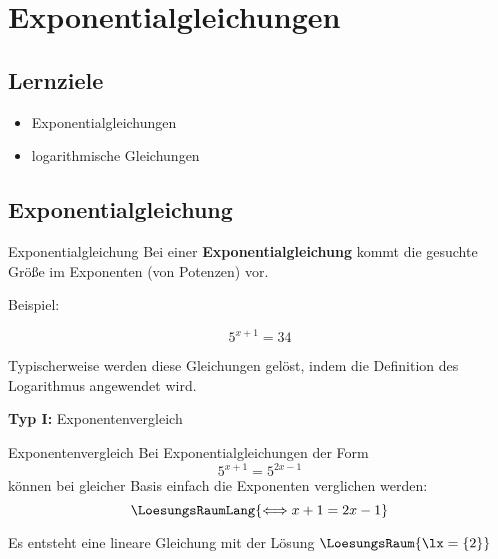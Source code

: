 
\section{Exponentialgleichungen}

\subsection*{Lernziele}

\begin{itemize}
\item Exponentialgleichungen
\item logarithmische Gleichungen 
\end{itemize}



\newpage


\subsection{Exponentialgleichung}
\begin{definition}{Exponentialgleichung}{}
  Bei einer \textbf{Exponentialgleichung} kommt die gesuchte Größe im
  Exponenten (von Potenzen) vor.
\end{definition}

Beispiel:

$$5^{x+1} = 34$$

Typischerweise werden diese Gleichungen gelöst, indem die Definition
des Logarithmus angewendet wird.

\textbf{Typ I:} Exponentenvergleich\\

\begin{rezept}{Exponentenvergleich}{}
Bei Exponentialgleichungen der Form $$5^{x+1} = 5^{2x-1}$$ können bei
gleicher Basis einfach die Exponenten verglichen werden:
$$\LoesungsRaumLang{\Longleftrightarrow x+1=2x-1}$$

Es entsteht eine lineare Gleichung mit der Lösung $\LoesungsRaum{\lx = \{2\}}$
\end{rezept}

